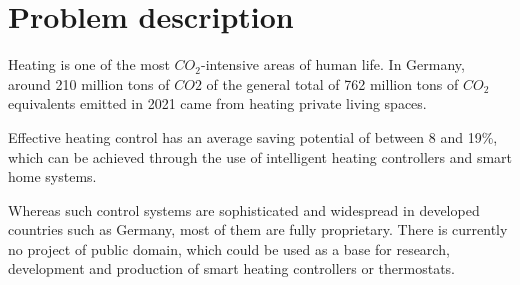 %
%

\chapter{Problem description}
\label{chap:Introduction}
%
Heating is one of the most $CO_2$-intensive areas of human life. In Germany, around 210 million tons of $CO2$ of the general total of 762 million tons of $CO_2$ equivalents emitted in 2021 came from heating private living spaces. \cite{StatistischesBundesamt.16.07.2025} \cite{Umweltbundesamt.13.10.2025}

Effective heating control has an average saving potential of between 8 and 19\%, which can be achieved through the use of intelligent heating controllers and smart home systems. \cite{Kersken.2018} 

Whereas such control systems are sophisticated and widespread in developed countries such as Germany, most of them are fully proprietary. There is currently no project of public domain, which could be used as a base for research, development and production of smart heating controllers or thermostats.